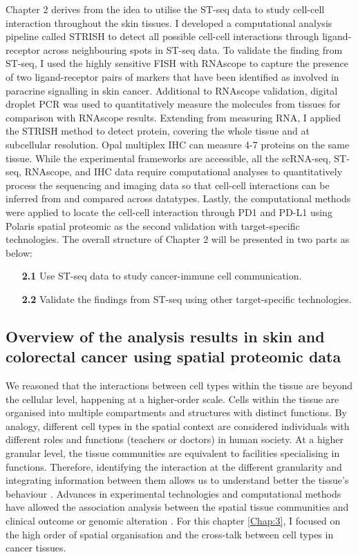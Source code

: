 Chapter 2 derives from the idea to utilise the ST-seq data to study cell-cell interaction throughout the skin tissues. I developed a computational analysis pipeline called STRISH to detect all possible cell-cell interactions through ligand-receptor across neighbouring spots in ST-seq data. To validate the finding from ST-seq, I used the highly sensitive FISH with RNAscope to capture the presence of two ligand-receptor pairs of markers that have been identified as involved in paracrine signalling in skin cancer. Additional to RNAscope validation, digital droplet PCR was used to quantitatively measure the molecules from tissues for comparison with RNAscope results. Extending from measuring RNA, I applied the STRISH method to detect protein, covering the whole tissue and at subcellular resolution. Opal multiplex IHC can measure 4-7 proteins on the same tissue. While the experimental frameworks are accessible, all the scRNA-seq, ST-seq, RNAscope, and IHC data require computational analyses to quantitatively process the sequencing and imaging data so that cell-cell interactions can be inferred from and compared across datatypes. Lastly, the computational methods were applied to locate the cell-cell interaction through PD1 and PD-L1 using Polaris spatial proteomic as the second validation with target-specific technologies. The overall structure of Chapter 2 will be presented in two parts as below:     
\begin{enumerate}[align=left]
    \item[\textbf{2.1}] Use ST-seq data to study cancer-immune cell communication.
    \item[\textbf{2.2}] Validate the findings from ST-seq using other target-specific technologies.
\end{enumerate}

\subsection{Overview of the analysis results in skin and colorectal cancer using spatial proteomic data}
We reasoned that the interactions between cell types within the tissue are beyond the cellular level, happening at a higher-order scale. Cells within the tissue are organised into multiple compartments and structures with distinct functions. By analogy, different cell types in the spatial context are considered individuals with different roles and functions (\ie teachers or doctors) in human society. At a higher granular level, the tissue communities are equivalent to facilities specialising in functions. Therefore, identifying the interaction at the different granularity and integrating information between them allows us to understand better the tissue's behaviour \cite{schurch2020coordinated}. Advances in experimental technologies and computational methods have allowed the association analysis between the spatial tissue communities and clinical outcome or genomic alteration \cite{schurch2020coordinated, danenberg2022breast}. For this chapter \ref{Chap:3}, I focused on the high order of spatial organisation and the cross-talk between cell types in cancer tissues.

